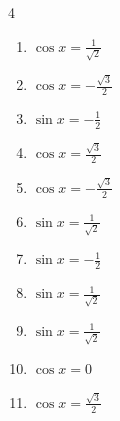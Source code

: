 \begin{multicols}{4}
\begin{enumerate}
  \item $\displaystyle \cos{x}  = \frac{1}{\sqrt{2}}$


\columnbreak %

  \item $\displaystyle \cos{x}  = -\frac{\sqrt{3}}{2}$


  \item $\displaystyle \sin{x}  = -\frac{1}{2}$


  \item $\displaystyle \cos{x}  = \frac{\sqrt{3}}{2}$


  \item $\displaystyle \cos{x}  = -\frac{\sqrt{3}}{2}$


  \item $\displaystyle \sin{x}  = \frac{1}{\sqrt{2}}$


  \item $\displaystyle \sin{x}  = -\frac{1}{2}$


  \item $\displaystyle \sin{x}  = \frac{1}{\sqrt{2}}$


  \item $\displaystyle \sin{x}  = \frac{1}{\sqrt{2}}$


  \item $\displaystyle \cos{x}  = 0$


  \item $\displaystyle \cos{x}  = \frac{\sqrt{3}}{2}$



\end{enumerate}
\end{multicols}
